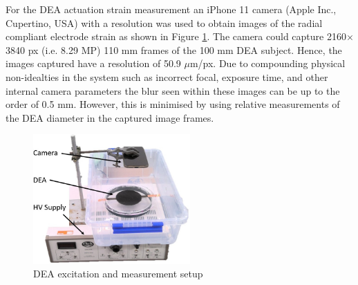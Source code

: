 For the DEA actuation strain measurement an iPhone 11 camera (Apple Inc., Cupertino, USA) with a resolution was used to obtain images of the radial compliant electrode strain as shown in Figure \ref{fig:HV_DEA_setup}. The camera could capture 2160$\times$3840 px (i.e. 8.29 MP) 110 mm frames of the 100 mm DEA subject. Hence, the images captured have a resolution of 50.9 $\mu$m/px. Due to compounding physical non-idealties in the system such as incorrect focal, exposure time, and other internal camera parameters the blur seen within these images can be up to the order of 0.5 mm. However, this is minimised by using relative measurements of the DEA diameter in the captured image frames. 
\begin{figure}[H]
	\centering
	\includegraphics[width=6cm]{Figures/HV_DEA_setup_labelled.jpg}
	\vspace{0.2cm}
	\caption{DEA excitation and measurement setup}
	\label{fig:HV_DEA_setup}
\end{figure}


